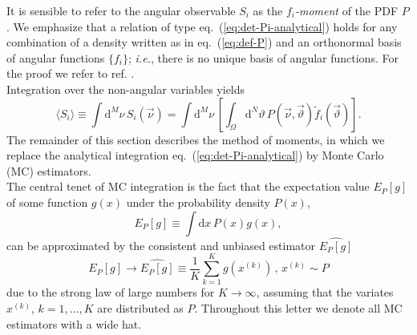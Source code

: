 \documentclass[aps,prd,reprint,nofootinbib,preprintnumbers]{revtex4}
\newcommand{\dual}[1]{\tilde{#1}}
\newcommand{\est}[1]{\widehat{#1}}
\newcommand{\ie}{\textit{i.e.}}
\newcommand{\nuvec}{\vec{\nu}}
\newcommand{\refeq}[1]{eq.~(\ref{eq:#1})}
\newcommand{\rmdx}[1]{\mbox{d} #1 \,} %
\newcommand{\thvec}{\vec{\vartheta}}
\renewcommand{\theta}{\vartheta}
\begin{document}
It is sensible to refer to the angular observable $S_i$ as the
\emph{$f_i$-moment} of the PDF $P$.  We emphasize that a relation of
type \refeq{det-Pi-analytical} holds for any combination of a density
written as in \refeq{def-P} and an orthonormal basis of angular
functions $\lbrace f_i \rbrace$; \ie, there is no unique
basis of angular functions. For the proof we refer to ref. \cite{Dighe:1998vk}.\\

Integration over the non-angular variables yields
\begin{equation}
    \langle S_i\rangle
    \equiv \int \rmdx{^M \nu} S_i(\nuvec)
    = \int \rmdx{^M \nu} \left[\int_{\Omega} \rmdx{^N \theta} P(\nuvec,\thvec) \dual{f}_i(\thvec) \right].
\end{equation}
The remainder of this section describes the method of moments, in which we replace the
analytical integration \refeq{det-Pi-analytical} by Monte Carlo (MC) estimators.\\


The central tenet of MC integration is the fact that the expectation value $E_P[g]$ of some function
$g(x)$ under the probability density $P(x)$,
\begin{equation}
    E_P[g] \equiv \int \rmdx{x} P(x) g(x),
\end{equation}
can be approximated \cite{MCSM-2004} by the consistent and unbiased
estimator $\est{E_P[g]}$~\cite[sec. 8.2]{James:2006zz}
\begin{equation}
    \label{eq:mc-id}
    E_P[g] \to \widehat{E_P[g]} \equiv \frac{1}{K} \sum_{k=1}^K g(x^{(k)}) \,,\,    x^{(k)} \sim P
\end{equation}
due to the strong law of large numbers for $K \to \infty$, assuming
that the variates $x^{(k)}$, $k = 1, \dots, K$ are distributed as
$P$.
Throughout this letter we denote all MC estimators with a wide hat.\\
\end{document}
